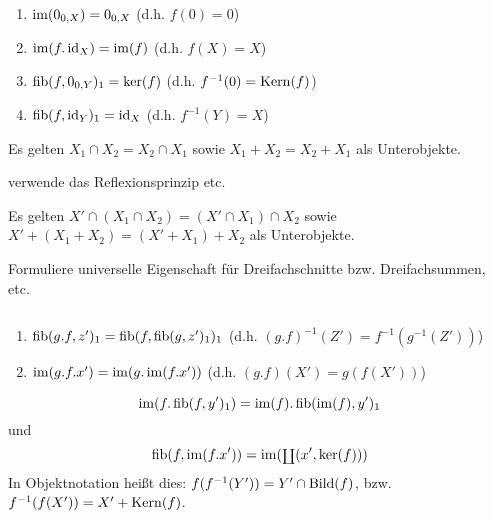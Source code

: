 \begin{lemm}[Regel (a)] $\quad$ %
\begin{enumerate}
\item $\operatorname{im}(0_{0,X}) = 0_{0,X}$ (d.h. $f(0) = 0$)
\item $\operatorname{im}(f.\operatorname{id}_X) = \operatorname{im}(f)$ (d.h. $f(X) = X$)
\item $\operatorname{fib}(f,0_{0,Y})_1 = \ker(f)$ (d.h. $f^{-1}(0) = \operatorname{Kern}(f)$)
\item $\operatorname{fib}(f,\operatorname{id}_Y)_1 = \operatorname{id}_X$ (d.h. $f^{-1}(Y) = X$)
\end{enumerate}
\end{lemm}

\begin{lemm}[Regel (b)]
Es gelten $X_1 \cap X_2 = X_2 \cap X_1$
sowie $X_1 + X_2 = X_2 + X_1$ als Unterobjekte.
\end{lemm}
\begin{bew}
verwende das Reflexionsprinzip etc.
\end{bew}

\begin{lemm}[Regel (c)]
Es gelten $X' \cap (X_1 \cap X_2) = (X' \cap X_1) \cap X_2$ 
sowie $X' + (X_1 + X_2) = (X' + X_1) + X_2$ als Unterobjekte.
\end{lemm}
\begin{bew}
Formuliere universelle Eigenschaft für Dreifachschnitte bzw. Dreifachsummen, etc.
\end{bew}

\begin{lemm}[Regel (d)] $\quad$ %
\begin{enumerate}
\item $\operatorname{fib}(g.f, z')_1 = \operatorname{fib}(f, \operatorname{fib}(g, z')_1)_1$ (d.h. $(g.f)^{-1}(Z') = f^{-1}(g^{-1}(Z'))$)
\item $\operatorname{im}(g.f.x') = \operatorname{im}(g.\operatorname{im}(f.x'))$ (d.h. $(g.f)(X') = g(f(X'))$)
\end{enumerate}
\end{lemm}

\begin{lemm}[Regel (e)]
\[
\operatorname{im}(f.\operatorname{fib}(f,y')_1) = \operatorname{im}(f).\operatorname{fib}(\operatorname{im}(f),y')_1
\]
und
\[
\operatorname{fib}(f,\operatorname{im}(f.x')) = \operatorname{im}(\operatorname{\scriptstyle\coprod}(x', \ker(f)))
\]
In Objektnotation heißt dies: $f(f^{-1}(Y')) = Y' \cap \operatorname{Bild}(f)$, bzw. $f^{-1}(f(X')) = X' + \operatorname{Kern}(f)$.
\end{lemm}
